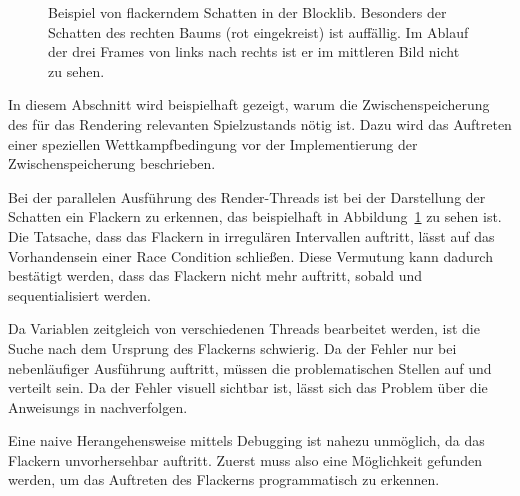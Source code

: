 \begin{figure}
	\hfill
	\hfill
	\caption[Beispiel von flackerndem Schatten in der Blocklib.]{Beispiel von flackerndem Schatten in der Blocklib. Besonders der Schatten des rechten Baums (rot eingekreist) ist auffällig. Im Ablauf der drei Frames von links nach rechts ist er im mittleren Bild nicht zu sehen.}\label{fig:flackern}
\end{figure}
In diesem Abschnitt wird beispielhaft gezeigt, warum die Zwischenspeicherung des für das Rendering relevanten Spielzustands nötig ist. Dazu wird das Auftreten einer speziellen Wettkampfbedingung vor der Implementierung der Zwischenspeicherung beschrieben. 

Bei der parallelen Ausführung des Render-Threads ist bei der Darstellung der Schatten ein Flackern zu erkennen, das beispielhaft in Abbildung~\ref{fig:flackern} zu sehen ist. Die Tatsache, dass das Flackern in irregulären Intervallen auftritt, lässt auf das Vorhandensein einer Race Condition schließen. Diese Vermutung kann dadurch bestätigt werden, dass das Flackern nicht mehr auftritt, sobald  und  sequentialisiert werden.

Da Variablen zeitgleich von verschiedenen Threads bearbeitet werden, ist die Suche nach dem Ursprung des Flackerns schwierig. Da der Fehler nur bei nebenläufiger Ausführung auftritt, müssen die problematischen Stellen auf  und  verteilt sein. Da der Fehler visuell sichtbar ist, lässt sich das Problem über die \glspl{Anweisung} in  nachverfolgen. 

Eine naive Herangehensweise mittels Debugging ist nahezu unmöglich, da das Flackern unvorhersehbar auftritt. Zuerst muss also eine Möglichkeit gefunden werden, um das Auftreten des Flackerns programmatisch zu erkennen.


